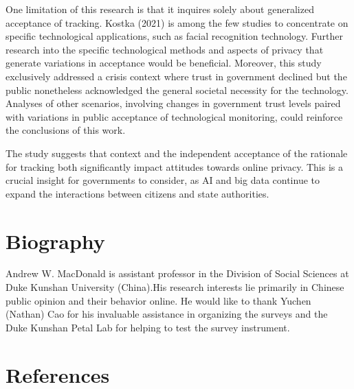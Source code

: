 \documentclass[
  letterpaper,
  DIV=11,
  numbers=noendperiod]{scrartcl}
\begin{document}
One limitation of this research is that it inquires solely about
generalized acceptance of tracking. Kostka (2021) is among the few
studies to concentrate on specific technological applications, such as
facial recognition technology. Further research into the specific
technological methods and aspects of privacy that generate variations in
acceptance would be beneficial. Moreover, this study exclusively
addressed a crisis context where trust in government declined but the
public nonetheless acknowledged the general societal necessity for the
technology. Analyses of other scenarios, involving changes in government
trust levels paired with variations in public acceptance of
technological monitoring, could reinforce the conclusions of this work.

The study suggests that context and the independent acceptance of the
rationale for tracking both significantly impact attitudes towards
online privacy. This is a crucial insight for governments to consider,
as AI and big data continue to expand the interactions between citizens
and state authorities.

\newpage{}

\section{Biography}\label{biography}

Andrew W. MacDonald is assistant professor in the Division of Social
Sciences at Duke Kunshan University (China).His research interests lie
primarily in Chinese public opinion and their behavior online. He would
like to thank Yuchen (Nathan) Cao for his invaluable assistance in
organizing the surveys and the Duke Kunshan Petal Lab for helping to
test the survey instrument.

\newpage{}

\section{References}\label{references}
\end{document}
